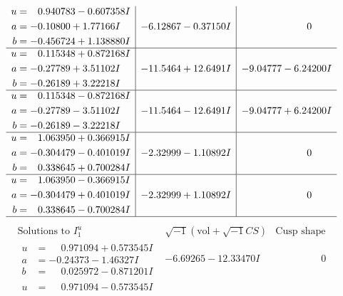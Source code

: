 \documentclass[1p]{elsarticle_modified}
\theoremstyle{definition}
\newcommand{\I}{\sqrt{-1}}
\begin{document}
$$\begin{array}{c|c|c}
\begin{aligned}
u &= \phantom{-}0.940783 - 0.607358 I \\
a &= -0.10800 + 1.77166 I \\
b &= -0.456724 + 1.138880 I\end{aligned}
 & -6.12867 - 0.37150 I & \phantom{-0.000000 } 0 \\ \hline\begin{aligned}
u &= \phantom{-}0.115348 + 0.872168 I \\
a &= -0.27789 + 3.51102 I \\
b &= -0.26189 + 3.22218 I\end{aligned}
 & -11.5464 + 12.6491 I & -9.04777 - 6.24200 I \\ \hline\begin{aligned}
u &= \phantom{-}0.115348 - 0.872168 I \\
a &= -0.27789 - 3.51102 I \\
b &= -0.26189 - 3.22218 I\end{aligned}
 & -11.5464 - 12.6491 I & -9.04777 + 6.24200 I \\ \hline\begin{aligned}
u &= \phantom{-}1.063950 + 0.366915 I \\
a &= -0.304479 - 0.401019 I \\
b &= \phantom{-}0.338645 + 0.700284 I\end{aligned}
 & -2.32999 - 1.10892 I & \phantom{-0.000000 } 0 \\ \hline\begin{aligned}
u &= \phantom{-}1.063950 - 0.366915 I \\
a &= -0.304479 + 0.401019 I \\
b &= \phantom{-}0.338645 - 0.700284 I\end{aligned}
 & -2.32999 + 1.10892 I & \phantom{-0.000000 } 0\\
 \hline 
 \end{array}$$\newpage$$\begin{array}{c|c|c}  
\text{Solutions to }I^u_{1}& \I (\text{vol} + \sqrt{-1}CS) & \text{Cusp shape}\\
 \hline 
\begin{aligned}
u &= \phantom{-}0.971094 + 0.573545 I \\
a &= -0.24373 - 1.46327 I \\
b &= \phantom{-}0.025972 - 0.871201 I\end{aligned}
 & -6.69265 - 12.33470 I & \phantom{-0.000000 } 0 \\ \hline\begin{aligned}
u &= \phantom{-}0.971094 - 0.573545 I \\

\end{aligned}
\end{array}$$
\end{document}
